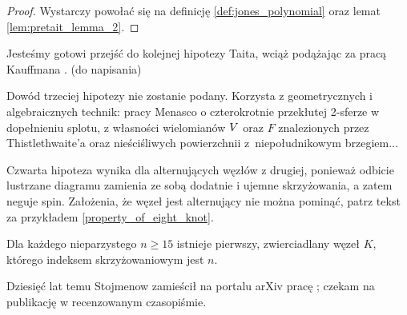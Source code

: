 \begin{proof}
    Wystarczy powołać się na definicję \ref{def:jones_polynomial} oraz lemat \ref{lem:pretait_lemma_2}.
\end{proof}

Jesteśmy gotowi przejść do kolejnej hipotezy Taita, wciąż podążając za pracą Kauffmana \cite{kauffman87}.
(do napisania)

Dowód trzeciej hipotezy nie zostanie podany.
Korzysta z geometrycznych i algebraicznych technik: pracy Menasco o czterokrotnie przekłutej 2-sferze w dopełnieniu splotu, z własności wielomianów $V$ oraz $F$ znalezionych przez Thistlethwaite'a oraz nieściśliwych powierzchnii z~niepołudnikowym brzegiem...

Czwarta hipoteza wynika dla alternujących węzłów z drugiej, ponieważ odbicie lustrzane diagramu zamienia ze sobą dodatnie i ujemne skrzyżowania, a zatem neguje spin.
Założenia, że węzeł jest alternujący nie można pominąć, patrz tekst za przykładem \ref{property_of_eight_knot}.

\begin{proposition}
    Dla każdego nieparzystego $n \ge 15$ istnieje pierwszy, zwierciadlany węzeł $K$, którego indeksem skrzyżowaniowym jest $n$.
\end{proposition}

Dziesięć lat temu Stojmenow zamieścił na portalu arXiv pracę \cite{stoimenow07}; czekam na publikację w recenzowanym czasopiśmie.

%


